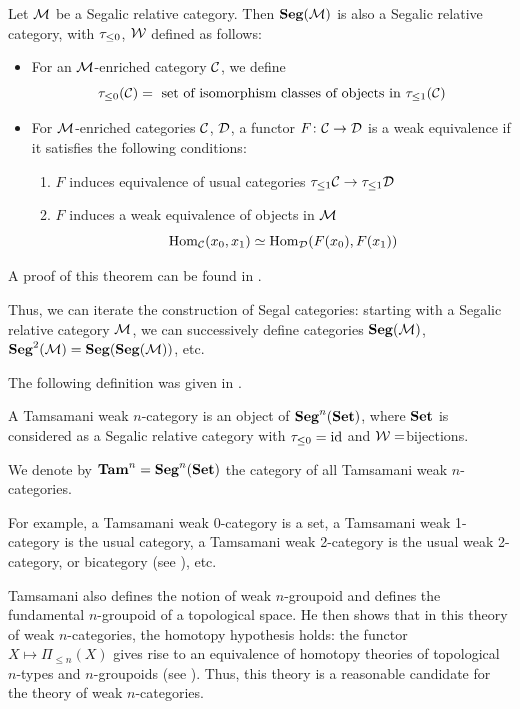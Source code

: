 \begin{theorem}\label{t:segalic}
  Let $\mathcal{M}$ be a Segalic relative category. Then $\mathbf{Seg}(\mathcal{M})$ is
  also a Segalic relative
  category, with $\tau_{\leq 0}$, $\mathcal{W}$ defined as follows:
  \begin{itemize}
    \item For an $\mathcal{M}$-enriched category $\mathcal{C}$, we define
     $$
      \tau_{\leq 0}(\mathcal{C})=
      \text{ set of isomorphism classes of objects in }\tau_{\leq 1}(\mathcal{C})
     $$
    \item For $\mathcal{M}$-enriched categories $\mathcal{C}$, $\mathcal{D}$, a functor
    $F \colon \mathcal{C}\to \mathcal{D}$ is a weak equivalence if it satisfies the
    following conditions:
    \begin{enumerate}
      \item $F$ induces equivalence of usual categories
        $\tau_{\leq 1}\mathcal{C} \to \tau_{\leq 1}\mathcal{D}$
      \item $F$ induces a weak equivalence of objects in $\mathcal{M}$
        $$
        \operatorname{Hom}_{\mathcal{C}}(x_0, x_1)\simeq \operatorname{Hom}_{\mathcal{D}}(F(x_0), F(x_1))
        $$
    \end{enumerate}
  \end{itemize}
\end{theorem}

A proof of this theorem can be found in
 \cite[Theorem 5.13]{schommer-pries-category}.

Thus, we can iterate the construction of Segal categories: starting with a
Segalic relative category $\mathcal{M}$, we can successively define categories
$\mathbf{Seg}(\mathcal{M})$, $\mathbf{Seg}^2(\mathcal{M})=\mathbf{Seg}(\mathbf{Seg}(\mathcal{M}))$, etc.

The following definition was given in \cite{tamsamani}.
\begin{definition}
  A Tamsamani weak $n$-category is an object of $\mathbf{Seg}^n(\mathbf{Set})$, where $\mathbf{Set}$
  is considered as a Segalic relative category with $\tau_{\leq 0}=\operatorname{id}$ and $\mathcal{W}=$bijections.

  We denote by $\mathbf{Tam}^n=\mathbf{Seg}^n(\mathbf{Set})$ the category of all Tamsamani weak
  $n$-categories.
\end{definition}
For example, a Tamsamani weak $0$-category is a set, a Tamsamani weak 1-category
is the usual category, a Tamsamani weak 2-category is the usual weak 2-category,
or bicategory (see ), etc.

Tamsamani also defines the notion of weak $n$-groupoid and defines the
fundamental $n$-groupoid of a topological space. He then shows that in this
theory of weak $n$-categories, the homotopy hypothesis holds: the functor
$X\mapsto \Pi_{\leq n}(X)$ gives rise to an equivalence of homotopy theories of
topological $n$-types and $n$-groupoids (see \cite[Theorem 8.0]{tamsamani}).
Thus, this theory is a reasonable candidate for the theory of weak
$n$-categories.

